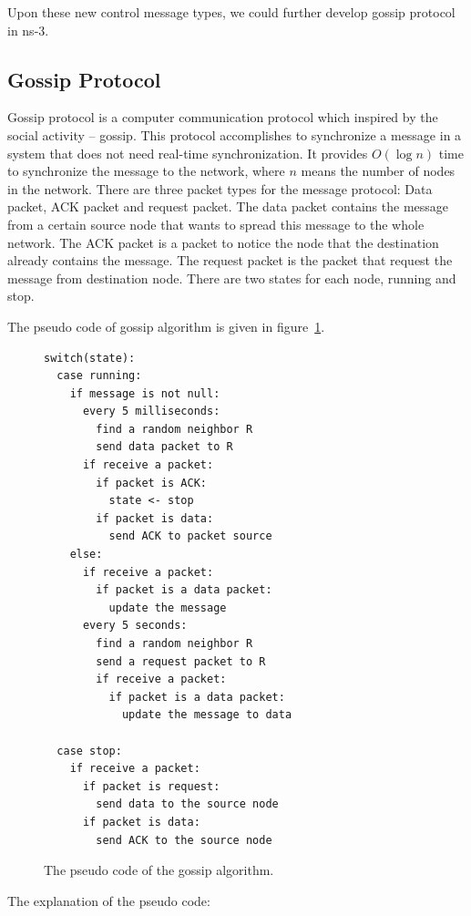 \documentclass[12pt,journal]{IEEEtran}
\begin{document}
Upon these new control message types, we could further develop gossip protocol in ns-3.

\subsection{Gossip Protocol }

Gossip protocol is a computer communication protocol which inspired by the social activity -- gossip. This protocol accomplishes to synchronize a message in a system that does not need real-time synchronization. It provides $O(\log n)$ time to synchronize the message to the network, where $n$ means the number of nodes in the network. There are three packet types for the message protocol: Data packet, ACK packet and request packet. The data packet contains the message from a certain source node that wants to spread this message to the whole network. The ACK packet is a packet to notice the node that the destination already contains the message. The request packet is the packet that request the message from destination node. There are two states for each node, running and stop.

The pseudo code of gossip algorithm is given in figure~\ref{fig:pseudo}.

\begin{figure}
 \centering
 \begin{Verbatim}[fontsize=\small]
switch(state):
  case running:
    if message is not null:
      every 5 milliseconds:
        find a random neighbor R
        send data packet to R
      if receive a packet:
        if packet is ACK:
          state <- stop
        if packet is data:
          send ACK to packet source
    else:
      if receive a packet:
        if packet is a data packet:
          update the message
      every 5 seconds:
        find a random neighbor R
        send a request packet to R
        if receive a packet:
          if packet is a data packet:
            update the message to data
                    
  case stop:
    if receive a packet:
      if packet is request:
        send data to the source node
      if packet is data:
        send ACK to the source node
\end{Verbatim}
 \caption{The pseudo code of the gossip algorithm.}
 \label{fig:pseudo}
\end{figure}

The explanation of the pseudo code: 
\end{document}
